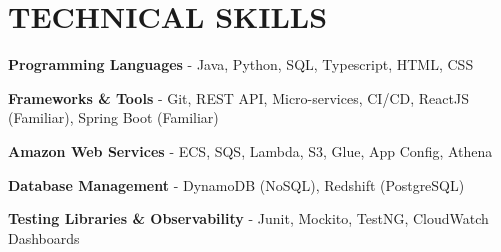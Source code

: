     \section{TECHNICAL SKILLS}

        \begin{onecolentry}
            \textbf{Programming Languages} - Java, Python, SQL, Typescript, HTML, CSS
        \end{onecolentry}

        \vspace{0.1 cm}

        \begin{onecolentry}
            \textbf{Frameworks \& Tools} - Git, REST API, Micro-services, CI/CD, ReactJS \small{(Familiar)}, Spring Boot \small{(Familiar)}
        \end{onecolentry}

        \vspace{0.1 cm}

        \begin{onecolentry}
            \textbf{Amazon Web Services} - ECS, SQS, Lambda, S3, Glue, App Config, Athena
        \end{onecolentry}

        \vspace{0.1 cm}

        \begin{onecolentry}
            \textbf{Database Management}  - DynamoDB \small{(NoSQL)}, Redshift \small{(PostgreSQL)}
        \end{onecolentry}

        \vspace{0.1 cm}
        
        \begin{onecolentry}
            \textbf{Testing Libraries \& Observability}  - Junit, Mockito, TestNG, CloudWatch Dashboards
        \end{onecolentry}